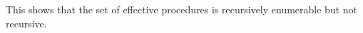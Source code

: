 {\begin{enumerate}
\begin{enumerate}
\begin{enumerate}
This shows that the set of effective procedures is recursively enumerable but not recursive.

	\end{enumerate}
\end{enumerate}
\end{enumerate}

}